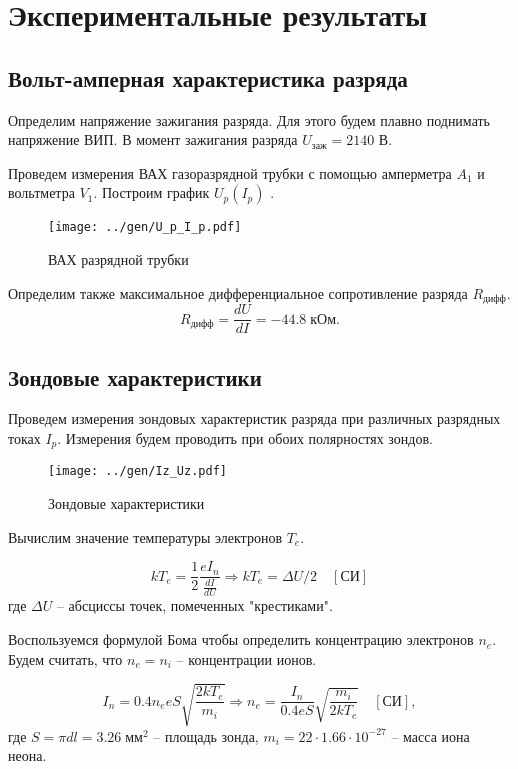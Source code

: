\section*{Экспериментальные результаты}

\subsection*{Вольт-амперная характеристика разряда}

Определим напряжение зажигания разряда. Для этого будем плавно поднимать напряжение ВИП. В момент зажигания разряда $U_{\text{заж}} = 2140$ В.

Проведем измерения ВАХ газоразрядной трубки с помощью амперметра $A_1$ и вольтметра $V_1$. Построим график $U_p(I_p)$ .

\begin{figure}[H]
	\centering
	\texttt{[image: ../gen/U\_p\_I\_p.pdf]}
	\caption{ВАХ разрядной трубки}
	\label{fig:upip}
\end{figure}

Определим также максимальное дифференциальное сопротивление разряда $R_{\text{дифф}}$.
$$ R_{\text{дифф}} = \frac{dU}{dI} = -44.8 \; \text{кОм}.$$

\subsection*{Зондовые характеристики}

Проведем измерения зондовых характеристик разряда при различных разрядных токах $I_p$. Измерения будем проводить при обоих полярностях зондов.

\begin{figure}[H]
	\centering
	\texttt{[image: ../gen/Iz\_Uz.pdf]}
	\caption{Зондовые характеристики}
	\label{fig:izuz}
\end{figure}

Вычислим значение температуры электронов $T_e$.

$$ kT_e = \frac{1}{2} \frac{e I_n}{\frac{dI}{dU}} \Rightarrow kT_e = \Delta U / 2 \quad [\text{СИ}] $$
где $\Delta U$ -- абсциссы точек, помеченных "крестиками".

Воспользуемся формулой Бома чтобы определить концентрацию электронов $n_e$. Будем считать, что $n_e = n_i$ -- концентрации ионов.

$$ I_n = 0.4 n_e e S \sqrt{\frac{2k T_e}{m_i}} \Rightarrow n_e = \frac{I_n}{0.4 e S} \sqrt{\frac{m_i}{2 k T_e}} \quad [\text{СИ}], $$
где $S = \pi d l = 3.26 \; \text{мм}^2$ -- площадь зонда, $m_i = 22 \cdot 1.66 \cdot 10^{-27}$ -- масса иона неона.

